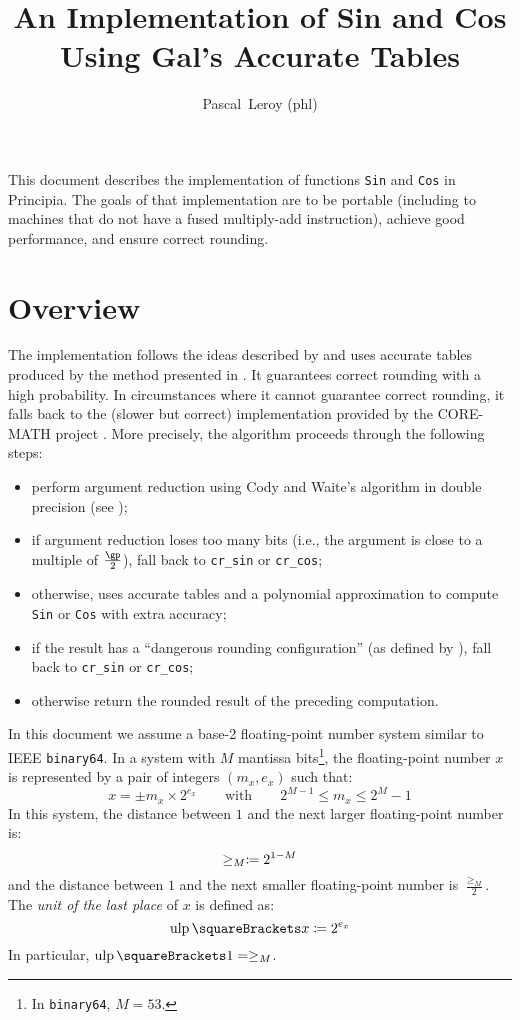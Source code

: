 \documentclass[10pt, a4paper, twoside]{basestyle}
\title{An Implementation of Sin and Cos Using Gal's Accurate Tables}
\date{\printdate{2025-02-02}}
\author{Pascal~Leroy (phl)}
\DeclareMathOperator{\ULP}{ulp}
\begin{document}
\maketitle
\begin{sloppypar}
\noindent
This document describes the implementation of functions \texttt{Sin} and \texttt{Cos} in Principia.  The goals of that implementation are to be portable (including to machines that do not have a fused multiply-add instruction), achieve good performance, and ensure correct rounding.
\end{sloppypar}

\section*{Overview}
The implementation follows the ideas described by \cite{GalBachelis1991} and uses accurate tables produced by the method presented in \cite{StehléZimmermann2005}.  It guarantees correct rounding with a high probability.  In circumstances where it cannot guarantee correct rounding, it falls back to the (slower but correct) implementation provided by the CORE-MATH project \cite{SibidanovZimmermannGlondu2022} \cite{ZimmermannSibidanovGlondu2024}.  More precisely, the algorithm proceeds through the following steps:
\begin{itemize}[nosep]
\item perform argument reduction using Cody and Waite's algorithm in double precision (see \cite[379]{MullerBrisebarreDeDinechinJeannerodLefevreMelquiondRevolStehleTorres2010});
\item if argument reduction loses too many bits (i.e., the argument is close to a multiple of $\frac{\gp}{2}$), fall back to \texttt{cr\_sin} or \texttt{cr\_cos};
\item otherwise, uses accurate tables and a polynomial approximation to compute \texttt{Sin} or \texttt{Cos} with extra accuracy;
\item if the result has a ``dangerous rounding configuration'' (as defined by \cite{GalBachelis1991}), fall back to \texttt{cr\_sin} or \texttt{cr\_cos};
\item otherwise return the rounded result of the preceding computation.
\end{itemize}
In this document we assume a base-2 floating-point number system similar to IEEE \texttt{binary64}.  In a system with $M$ mantissa bits\footnote{In \texttt{binary64}, $M = 53$.}, the floating-point number $x$ is represented by a pair of integers $(m_x, e_x)$ such that:
\[
x = ±m_x \times 2^{e_x} \qquad\text{with}\qquad 2^{M-1} \leq m_x \leq 2^M - 1
\]
In this system, the distance between $1$ and the next larger floating-point number is:
\[
\ge_M \coloneq 2^{1-M}
\]
and the distance between $1$ and the next smaller floating-point number is $\frac{\ge_M}{2}$.
The \textit{unit of the last place} of $x$ is defined as:
\[
\ULP\of{x} \DefineAs 2^{e_x}
\]
In particular, $\ULP\of{1} = \ge_M$.
\end{document}
